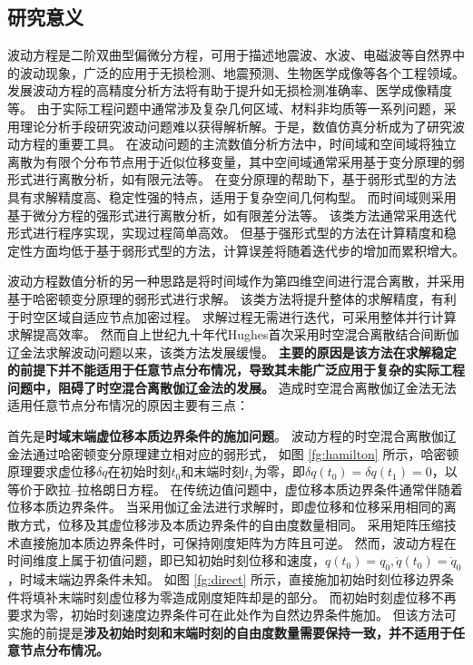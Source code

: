 
\subsection{研究意义}
波动方程是二阶双曲型偏微分方程\cite{bedford1994}，可用于描述地震波、水波、电磁波等自然界中的波动现象，广泛的应用于无损检测、地震预测、生物医学成像等各个工程领域。
发展波动方程的高精度分析方法将有助于提升如无损检测准确率、医学成像精度等。
由于实际工程问题中通常涉及复杂几何区域、材料非均质等一系列问题，采用理论分析手段研究波动问题难以获得解析解。于是，数值仿真分析成为了研究波动方程的重要工具。
在波动问题的主流数值分析方法中，时间域和空间域将独立离散为有限个分布节点用于近似位移变量，其中空间域通常采用基于变分原理的弱形式进行离散分析，如有限元法等。
在变分原理的帮助下，基于弱形式型的方法具有求解精度高、稳定性强的特点，适用于复杂空间几何构型。
而时间域则采用基于微分方程的强形式进行离散分析，如有限差分法等。
该类方法通常采用迭代形式进行程序实现，实现过程简单高效。
但基于强形式型的方法在计算精度和稳定性方面均低于基于弱形式型的方法，计算误差将随着迭代步的增加而累积增大。

波动方程数值分析的另一种思路是将时间域作为第四维空间进行混合离散，并采用基于哈密顿变分原理的弱形式进行求解。
该类方法将提升整体的求解精度，有利于时空区域自适应节点加密过程。
求解过程无需进行迭代，可采用整体并行计算求解提高效率。
然而自上世纪九十年代Hughes首次采用时空混合离散结合间断伽辽金法求解波动问题\cite{hughes1988}以来，该类方法发展缓慢。
\textbf{
主要的原因是该方法在求解稳定的前提下并不能适用于任意节点分布情况，导致其未能广泛应用于复杂的实际工程问题中，阻碍了时空混合离散伽辽金法的发展。
}
造成时空混合离散伽辽金法无法适用任意节点分布情况的原因主要有三点：

首先是\textbf{时域末端虚位移本质边界条件的施加问题}。
波动方程的时空混合离散伽辽金法通过哈密顿变分原理建立相对应的弱形式，
如图 \ref{fg:hamilton} 所示，哈密顿原理要求虚位移$\delta q$在初始时刻$t_0$和末端时刻$t_1$为零，即$\delta q(t_0)=\delta q(t_1)=0$，以等价于欧拉--拉格朗日方程\cite{arnold1978}。
在传统边值问题中，虚位移本质边界条件通常伴随着位移本质边界条件。
当采用伽辽金法进行求解时，即虚位移和位移采用相同的离散方式，位移及其虚位移涉及本质边界条件的自由度数量相同。
采用矩阵压缩技术直接施加本质边界条件时，可保持刚度矩阵为方阵且可逆。
然而，波动方程在时间维度上属于初值问题，即已知初始时刻位移和速度，$q(t_0)=q_0,\dot q(t_0) = \dot q_0$，时域末端边界条件未知。
如图 \ref{fg:direct} 所示，直接施加初始时刻位移边界条件将填补末端时刻虚位移为零造成刚度矩阵却是的部分。
而初始时刻虚位移不再要求为零，初始时刻速度边界条件可在此处作为自然边界条件施加。
但该方法可实施的前提是\textbf{涉及初始时刻和末端时刻的自由度数量需要保持一致，并不适用于任意节点分布情况。}


